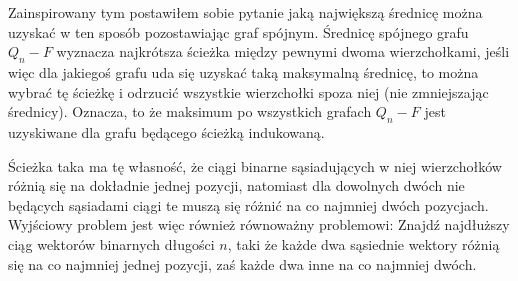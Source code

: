 \documentclass{pracamgr}
\begin{document}
   Zainspirowany tym postawiłem sobie pytanie jaką największą średnicę można uzyskać w ten sposób pozostawiając graf spójnym.
   Średnicę spójnego grafu $Q_n-F$ wyznacza najkrótsza ścieżka między pewnymi dwoma wierzchołkami, jeśli więc dla jakiegoś grafu uda się uzyskać
   taką maksymalną średnicę, to można wybrać tę ścieżkę i odrzucić wszystkie wierzchołki spoza niej (nie zmniejszając średnicy).
   Oznacza, to że maksimum po wszystkich grafach $Q_n-F$ jest uzyskiwane dla grafu będącego ścieżką indukowaną.
   
   Ścieżka taka ma tę własność, że ciągi binarne sąsiadujących w niej wierzchołków różnią się na dokładnie jednej pozycji,
   natomiast dla dowolnych dwóch nie będących sąsiadami ciągi te muszą się różnić na co najmniej dwóch pozycjach.
   Wyjściowy problem jest więc również równoważny problemowi:\newline
   Znajdź najdłuższy ciąg wektorów binarnych długości $n$, taki
   że każde dwa sąsiednie wektory różnią się na co najmniej jednej pozycji, zaś każde dwa inne na co najmniej dwóch.
\end{document}
